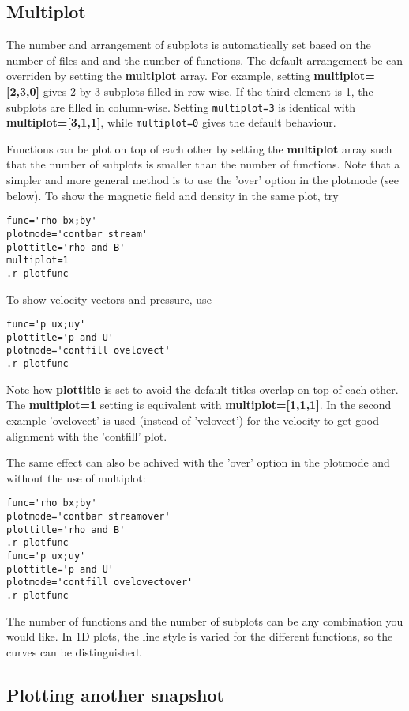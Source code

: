 \subsection{Multiplot \label{s-multiplot}}

   The number and arrangement of subplots is automatically set based 
   on the number of files and and the number of functions. 
   The default arrangement be can overriden by setting the
   {\bf multiplot} array. For example, setting 
   {\bf multiplot=[2,3,0]} gives 2 by 3 subplots filled in row-wise.
   If the third element is 1, the subplots are filled in column-wise.
   Setting {\tt multiplot=3} is identical with {\bf multiplot=[3,1,1]},
   while {\tt multiplot=0} gives the default behaviour.

   Functions can be plot on top of each other by setting the {\bf multiplot}
   array such that the number of subplots is smaller than the number of
   functions. Note that a simpler and more general method is to use the 'over'
   option in the plotmode (see below). 
   To show the magnetic field and density in the same plot, try
\begin{verbatim}
func='rho bx;by'
plotmode='contbar stream'
plottitle='rho and B'
multiplot=1
.r plotfunc
\end{verbatim}
   To show velocity vectors and pressure, use
\begin{verbatim}
func='p ux;uy'
plottitle='p and U'
plotmode='contfill ovelovect'
.r plotfunc
\end{verbatim}
   Note how {\bf plottitle} is set to avoid the default titles
   overlap on top of each other. The {\bf multiplot=1} setting
   is equivalent with {\bf multiplot=[1,1,1]}. In the second example
   'ovelovect' is used (instead of 'velovect') for the velocity to get 
   good alignment with the 'contfill' plot. 

   The same effect can also be achived with the 'over' option in the 
   plotmode and without the use of multiplot:
\begin{verbatim}
func='rho bx;by'
plotmode='contbar streamover'
plottitle='rho and B'
.r plotfunc
func='p ux;uy'
plottitle='p and U'
plotmode='contfill ovelovectover'
.r plotfunc
\end{verbatim}
   The number of functions and the number of subplots can be any combination
   you would like. In 1D plots, the line style is varied for the different 
   functions, so the curves can be distinguished.

\subsection{Plotting another snapshot \label{s-plot-another}}


